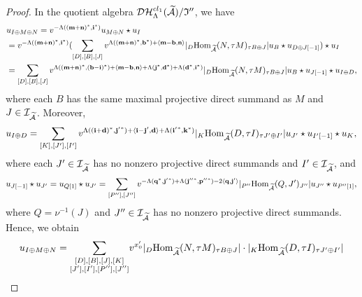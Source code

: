 \documentclass[reqno,12pt]{amsart}
\numberwithin{equation}{section}
\def\lr#1{\langle #1\rangle} \def\fin{\hfill$\square$}  \def\lra{\longrightarrow} \def\mod{\mbox{\rm \textbf{mod}}\,}\def\Mod{\mbox{\rm mod}\,}\def\top{\mbox{\rm top}\,}\def\soc{\mbox{\rm soc}\,}
\theoremstyle{plain} %
\theoremstyle{definition} %
\begin{document}
\begin{proof}
In the quotient algebra $\mathcal {D}\mathcal {H}_\Lambda^{{cl}_1}(\widetilde{\mathcal{A}})/\mathfrak{I}''$, we have
\begin{equation*}
\begin{split}
&u_{I\oplus M\oplus N}
=v^{-\Lambda((\mathbf{m}+\mathbf{n})^\ast, \mathbf{i}^\ast)} u_{M\oplus N}\star u_I\\
&=v^{-\Lambda((\mathbf{m}+\mathbf{n})^\ast, \mathbf{i}^\ast)} (\sum_{[D],[B],[J]}v^{\Lambda((\mathbf{m}+\mathbf{n})^\ast,\mathbf{b}^\ast)+\langle \mathbf{m}-\mathbf{b},\mathbf{n}\rangle}|_D\mbox{\rm Hom}_{\widetilde{\mathcal{A}}}(N,\tau M)_{\tau B\oplus J}|u_B\star u_{D\oplus J[-1]})\star u_I\\
&=\sum_{[D],[B],[J]}v^{\Lambda((\mathbf{m}+\mathbf{n})^\ast,(\mathbf{b}-\mathbf{i})^\ast)+\langle \mathbf{m}-\mathbf{b},\mathbf{n}\rangle+\Lambda({\bf j}^\ast,{\bf d}^\ast)+\Lambda({\bf d}^\ast,{\bf i}^\ast)}|_D\mbox{\rm Hom}_{\widetilde{\mathcal{A}}}(N,\tau M)_{\tau B\oplus J}|u_B\star u_{J[-1]}\star u_{I\oplus D},
\end{split}\end{equation*}
where each $B$ has the same maximal projective direct summand as $M$ and $J\in\mathcal{I}_{\widetilde{\mathcal{A}}}$. Moreover,
\begin{equation*}
\begin{split}
u_{I\oplus D}=\sum_{[K],[J'],[I']}v^{\Lambda(({\bf i}+{\bf d})^\ast,{{\bf j}'}^\ast)+\lr{{\bf i}-{\bf j}',{\bf d}}+\Lambda({{\bf i}'}^\ast,{\bf k}^\ast)}|_K\Hom_{\widetilde{\A}}(D,\tau I)_{\tau J'\oplus I'}|u_{J'}\star u_{I'[-1]}\star u_K,
\end{split}\end{equation*}
where each $J'\in\mathcal{I}_{\widetilde{\mathcal{A}}}$ has no nonzero projective direct summands and $I'\in\mathcal{I}_{\widetilde{\mathcal{A}}}$,
and
\begin{equation*}
\begin{split}
u_{J[-1]}\star u_{J'}=u_{Q[1]}\star u_{J'}
=\sum_{[P''],[J'']}v^{-\Lambda({\bf q}^\ast,{{\bf j}'}^\ast)+\Lambda({{\bf j}''}^\ast,{{\bf p}''}^\ast)-2\lr{{\bf q},{\bf j}'}}|_{P''}\Hom_{\widetilde{\A}}(Q,J')_{J''}|u_{J''}\star u_{P''[1]},
\end{split}\end{equation*}
where $Q=\nu^{-1}(J)$ and $J''\in\mathcal{I}_{\widetilde{\mathcal{A}}}$ has no nonzero projective direct summands. Hence, we obtain
\begin{equation*}
\begin{split}
u_{I\oplus M\oplus N}
=\sum_{\substack{[D],[B],[J], [K]\\ [J'],[I'], [P''],[J'']}}&v^{x'_0}|_D\Hom_{\widetilde{\A}}(N,\tau M)_{\tau B\oplus J}|\cdot |_K\Hom_{\widetilde{\A}}(D,\tau I)_{\tau J'\oplus I'}|\\

\end{split}
\end{equation*}
\end{proof}
\end{document}
